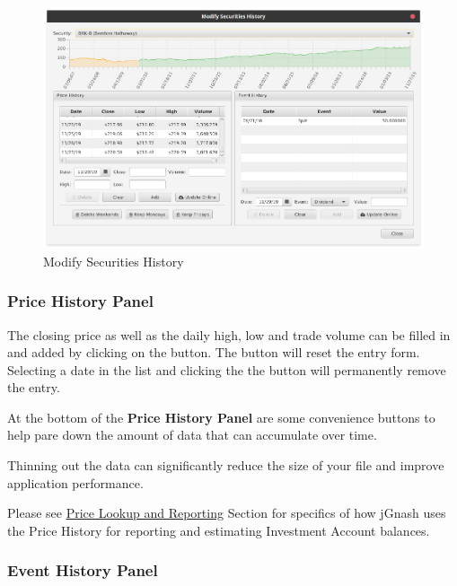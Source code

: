 \documentclass[letterpaper,12pt]{book}
\begin{document}
     \begin{figure}[h]                          
        \caption{Modify Securities History}                  
        \label{fig:securitieshistorydialog}   
        \includegraphics[width=1.0\linewidth]{images/modifySecurityHistory}
    \end{figure}
    
    \subsubsection{Price History Panel}
        
    The closing price as well as the daily high, low and trade volume can be filled in and added by clicking
    on the  button.  The  button will reset the entry form.  Selecting a date in the list
    and clicking the the  button will permanently remove the entry.
    
    At the bottom of the \textbf{Price History Panel} are some convenience buttons to help pare down the amount of data
    that can accumulate over time.  
    
    Thinning out the data can significantly reduce the size of your file and improve application performance.
    
    Please see \hyperref[sec:pricelookup]{Price Lookup and Reporting} Section for specifics of how jGnash uses
    the Price History for reporting and estimating Investment Account balances.
    
    \subsubsection{Event History Panel}
    
\end{document}
